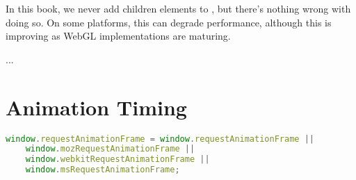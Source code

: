 \begin{sidenote}
In this book, we never add children elements to , but there's nothing wrong with doing so.  On some platforms, this can degrade performance, although this is improving as WebGL implementations are maturing.
\end{sidenote}

...

\section{Animation Timing}

\begin{lstlisting}[language=JavaScript]
  window.requestAnimationFrame = window.requestAnimationFrame ||
    window.mozRequestAnimationFrame ||
    window.webkitRequestAnimationFrame ||
    window.msRequestAnimationFrame;
\end{lstlisting}


